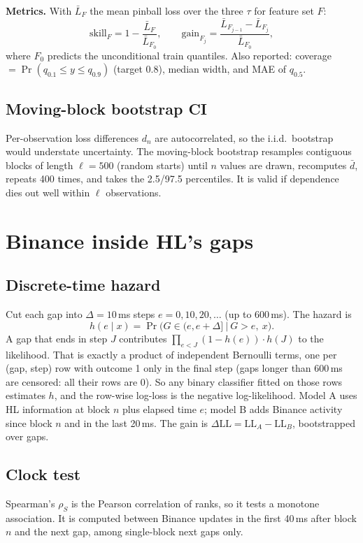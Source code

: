 \documentclass[11pt,a4paper]{article}
\begin{document}
\textbf{Metrics.} With $\bar L_F$ the mean pinball loss over the three $\tau$ for feature set $F$:
\begin{equation}
  \text{skill}_F = 1-\frac{\bar L_F}{\bar L_{F_0}},\qquad
  \text{gain}_{F_j} = \frac{\bar L_{F_{j-1}}-\bar L_{F_j}}{\bar L_{F_0}},
\end{equation}
where $F_0$ predicts the unconditional train quantiles. Also reported: coverage $=\Pr(q_{0.1}\le y\le q_{0.9})$ (target 0.8), median width, and MAE of $q_{0.5}$.

\subsection{Moving-block bootstrap CI}
Per-observation loss differences $d_n$ are autocorrelated, so the i.i.d.\ bootstrap would understate uncertainty. The moving-block bootstrap resamples contiguous blocks
of length $\ell=500$ (random starts) until $n$ values are drawn, recomputes $\bar d$, repeats 400 times, and takes the 2.5/97.5 percentiles.
It is valid if dependence dies out well within $\ell$ observations.

\section{Binance inside HL's gaps}

\subsection{Discrete-time hazard}
Cut each gap into $\Delta=10$\,ms steps $e=0,10,20,\dots$ (up to 600\,ms). The hazard is
\begin{equation}
  h(e\mid x)=\Pr\bigl(G\in(e,e+\Delta]\ \big|\ G>e,\ x\bigr).
\end{equation}
A gap that ends in step $J$ contributes $\prod_{e<J}(1-h(e))\cdot h(J)$ to the likelihood. That is exactly a product of independent Bernoulli terms, one per
(gap, step) row with outcome 1 only in the final step (gaps longer than 600\,ms are censored: all their rows are 0). So any binary classifier fitted on those rows estimates $h$, and the row-wise log-loss is the
negative log-likelihood. Model A uses HL information at block $n$ plus elapsed time $e$; model B adds Binance activity since block $n$ and in the last 20\,ms. The gain is
$\Delta\text{LL}=\text{LL}_A-\text{LL}_B$, bootstrapped over gaps.

\subsection{Clock test}
Spearman's $\rho_S$ is the Pearson correlation of ranks, so it tests a monotone association. It is computed between Binance updates in the first 40\,ms after block $n$ and the next gap, among single-block next gaps only.
\end{document}
